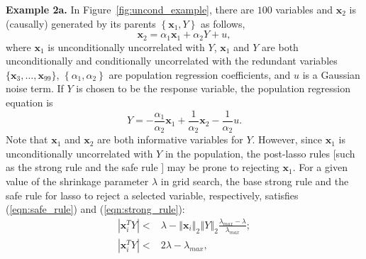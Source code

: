 \documentclass[11pt,review,authoryear]{elsarticle}
\begin{document}
\smallskip
\noindent
\textbf{Example 2a.} In Figure~\ref{fig:uncond_example}, there are $100$ variables and $\mathbf{x}_2$ is (causally) generated by its parents $\left\{ \mathbf{x}_1, Y \right\}$ as follows,
%
\begin{equation}
  \mathbf{x}_2 = \alpha_1 \mathbf{x}_1 + \alpha_2 Y + u,
  \label{eqn:collider_1}
\end{equation}
%
where $\mathbf{x}_1$ is unconditionally uncorrelated with $Y$, $\mathbf{x}_1$ and $Y$ are both unconditionally and conditionally uncorrelated with the redundant variables $\{\mathbf{x}_3, \ldots, \mathbf{x}_{99}\}$, $\left\{\alpha_1, \alpha_2 \right\}$ are population regression coefficients, and $u$ is a Gaussian noise term. If $Y$ is chosen to be the response variable, the population regression equation is
%
\begin{equation}
  Y = -\frac{\alpha_1}{\alpha_2} \mathbf{x}_1 + \frac{1}{\alpha_2} \mathbf{x}_2 - \frac{1}{\alpha_2}u.
  \label{eqn:collider_2}
\end{equation}
%
Note that $\mathbf{x}_1$ and $\mathbf{x}_2$ are both informative variables for $Y$. However, since $\mathbf{x}_1$ is unconditionally uncorrelated with $Y$ in the population, the post-lasso rules [such as the strong rule \citep{tibshirani2012strong} and the safe rule \citep{ghaoui2010safe}] may be prone to rejecting $\mathbf{x}_1$. For a given value of the shrinkage parameter $\lambda$ in grid search, the base strong rule and the safe rule for lasso to reject a selected variable, respectively, satisfies (\ref{eqn:safe_rule}) and (\ref{eqn:strong_rule}):
%
\begin{eqnarray}
  \left\vert \mathbf{x}_i^T Y \right\vert < & \lambda - \left\Vert \mathbf{x}_i \right\Vert_2 \left\Vert Y \right\Vert_2 \frac{\lambda_{max} - \lambda} {\lambda_{max}} ; \label{eqn:safe_rule} \\
  \left\vert \mathbf{x}_i^T Y \right\vert < & 2\lambda - \lambda_{max} , \label{eqn:strong_rule}
  \label{eqn:post_estmation_rule}
\end{eqnarray}
%
\end{document}
